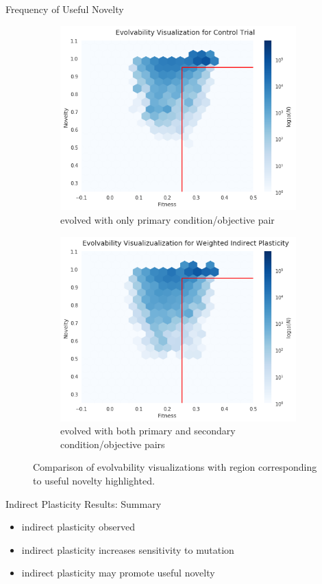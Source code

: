 \begin{frame}{Frequency of Useful Novelty}
 
 \begin{figure}
 \begin{subfigure}[b]{0.5\textwidth}
    \centering
    \includegraphics[width=\textwidth]{img/ev_w0_target}
    \caption{evolved with only primary condition/objective pair}
    \label{subfig:primary_only}
  \end{subfigure}%
    \begin{subfigure}[b]{0.5\textwidth}
    \centering
    \includegraphics[width=\textwidth]{img/ev_w0_2_target}
    \caption{evolved with both primary and secondary condition/objective pairs}
    \label{subfig:primary_secondary}
  \end{subfigure}%

 	\captionsetup{singlelinecheck=off,justification=raggedright}
  	\caption{Comparison of evolvability visualizations with region corresponding to useful novelty highlighted.}
    \label{fig:freq_useful_novelty}
\end{figure}
\end{frame}

\begin{frame}{Indirect Plasticity Results: Summary}
\begin{itemize}
  \item indirect plasticity observed
  \item indirect plasticity increases sensitivity to mutation
  \item indirect plasticity may promote useful novelty 
\end{itemize}
\end{frame}